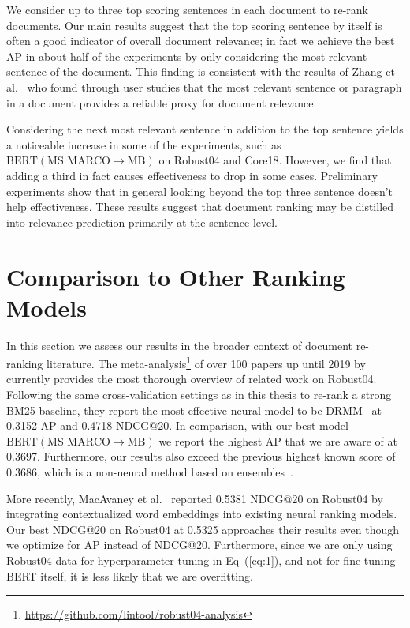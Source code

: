 We consider up to three top scoring sentences in each document to re-rank documents.
Our main results suggest that the top scoring sentence by itself is often a good indicator of overall document relevance; in fact we achieve the best AP in about half of the experiments by only considering the most relevant sentence of the document.
This finding is consistent with the results of Zhang et al.~\cite{zhang2018effective} who found through user studies that the most relevant sentence or paragraph in a document provides a reliable proxy for document relevance.

Considering the next most relevant sentence in addition to the top sentence yields a noticeable increase in some of the experiments, such as $ \textrm{BERT}(\textrm{MS MARCO}\rightarrow\textrm{MB}) $ on Robust04 and Core18.
However, we find that adding a third in fact causes effectiveness to drop in some cases.
Preliminary experiments show that in general looking beyond the top three sentence doesn't help effectiveness.
These results suggest that document ranking may be distilled into relevance prediction primarily at the sentence level.


\section{Comparison to Other Ranking Models}

In this section we assess our results in the broader context of document re-ranking literature.
The meta-analysis\footnote{\url{https://github.com/lintool/robust04-analysis}} of over 100 papers up until 2019 by \cite{Yang_etal_SIGIR2019} currently provides the most thorough overview of related work on Robust04.
Following the same cross-validation settings as in this thesis to re-rank a strong BM25 baseline, they report the most effective neural model to be DRMM~\cite{guo2016deep} at 0.3152 AP and 0.4718 NDCG@20.
In comparison, with our best model $ \textrm{BERT}(\textrm{MS MARCO}\rightarrow\textrm{MB}) $ we report the highest AP that we are aware of at 0.3697.
Furthermore, our results also exceed the previous highest known score of 0.3686, which is a non-neural method based on ensembles~\cite{Cormack:2009:RRF:1571941.1572114}.

More recently, MacAvaney et al.~\cite{MacAvaney_etal_SIGIR2019} reported 0.5381 NDCG@20 on Robust04 by integrating contextualized word embeddings into existing neural ranking models.
Our best NDCG@20 on \mbox{Robust04} at 0.5325 approaches their results even though we optimize for AP instead of NDCG@20.
Furthermore, since we are only using Robust04 data for hyperparameter tuning in Eq~(\ref{eq:1}), and not for fine-tuning BERT itself, it is less likely that we are overfitting.

